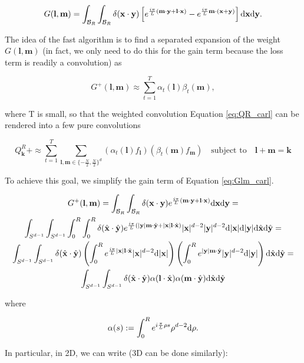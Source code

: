 \documentclass{article}
\def\b{\mathbf}
\def\t{\text}
\begin{document}
\begin{equation} \label{eq:Glm_carl}
    G(\b l, \b m) = \int_{\mathcal{B}_R} \int_{\mathcal{B}_R} \delta(\b x \cdot \b y) \left[  e^{\frac{i \pi}{L} (\b m \cdot \b y + \b l \cdot \b x) } - e^{\frac{i \pi}{L} \b m \cdot (\b x + \b y)} \right] \t d \b x \t d \b y.
\end{equation}

The idea of the fast algorithm is to find a separated expansion of the weight $G(\b l, \b m)$ (in fact, we only need to do this for the gain term because the loss term is readily a convolution) as

\[
    G^+(\b l, \b m) \approx \sum_{t = 1}^T \alpha_t(\b l) \beta_t(\b m),
\]

where T is small, so that the weighted convolution Equation \ref{eq:QR_carl} can be rendered into a few pure convolutions

\[
    Q_{\b k}^R+ \approx \sum_{t=1}^T \sum_{\b l,\b m \in \{-\frac{N}{2}, \frac{N}{2}\}^d} (\alpha_t(\b l) f_{\b l})(\beta_t(\b m) f_{\b m})  \quad \text{subject to} \quad \b l + \b m = \b k
\]

To achieve this goal, we simplify the gain term of Equation \ref{eq:Glm_carl}.

\begin{gather*}
    G^+(\b l, \b m) = \int_{\mathcal{B}_R} \int_{\mathcal{B}_R} \delta(\b x \cdot \b y) e^{\frac{i \pi}{L} (\b m \cdot \b y + \b l \cdot \b x) } \t d \b x \t d \b y = \\
    \int_{S^{d-1}} \int_{S^{d-1}} \int_0^R \int_0^R \delta(\hat{\b x} \cdot \hat{\b y}) e^{\frac{i \pi}{L} (|\b y| \b m \cdot \hat{\b y} + |\b x| \b l \cdot \hat{\b x})} |\b x|^{d-2} |\b y|^{d-2} \t d |\b x| \t d |\b y| \t d \hat{\b x} \t d \hat{\b y} = \\
    \int_{S^{d-1}} \int_{S^{d-1}} \delta(\hat{\b x} \cdot \hat{\b y}) \left( \int_0^R e^{\frac{i \pi}{L} |\b x| \b l \cdot \hat{\b x}} |\b x|^{d-2} \t d |\b x| \right) \left( \int_0^R  e^{|\b y| \b m \cdot \hat{\b y}} |\b y|^{d-2}  \t d |\b y| \right) \t d \hat{\b x} \t d \hat{\b y} = \\
    \int_{S^{d-1}} \int_{S^{d-1}} \delta(\hat{\b x} \cdot \hat{\b y}) \alpha( \b l \cdot \hat{\b x}) \alpha( \b m \cdot \hat{\b y}) \t d \hat{\b x} \t d \hat{\b y}
\end{gather*}

where 

\[
    \alpha(s) := \int_0^R e^{i \frac{\pi}{L} \rho s} \rho^{d-2} \t d \rho.
\]

In particular, in 2D, we can write (3D can be done similarly):
\end{document}
